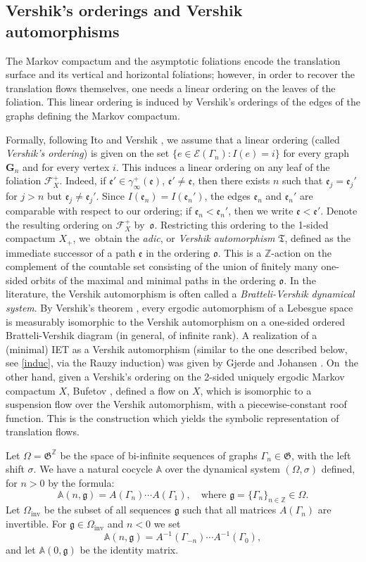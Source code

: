 \documentclass[JEP,XML,SOM,Unicode]{cedram}
\let\mathcal\mathscr
\newcommand{\inv}{\mathrm{inv}}
\theoremstyle{plain}
\theoremstyle{definition}
\newcommand \G {{\boldsymbol G}}
\let\gam\gamma
\let\Om\Omega
\let\Gam\Gamma
\let\sig\sigma
\newcommand\ef{\mathfrak{e}}
\newcommand\gf{\mathfrak{g}}
\newcommand\ok{\mathfrak{o}}
\newcommand\Frg{\mathfrak{G}}
\newcommand{\Ek}{\mathcal{E}}
\newcommand{\Fk}{\mathcal{F}}
\newcommand\Aa{\mathbb{A}}
\newcommand{\Z}{\mathbb{Z}}
\begin{document}
\subsection{Vershik's orderings and Vershik automorphisms}
The Markov compactum and the asymptotic foliations encode the translation surface and its vertical and horizontal foliations; however, in order to recover the translation flows themselves, one needs a linear ordering on the leaves of the foliation. This linear ordering is induced by Vershik's orderings of the edges of the graphs defining the Markov compactum.

Formally, following Ito \cite{Ito} and Vershik \cite{Vershik1,Vershik2}, we assume that a linear ordering (called \emph{Vershik's ordering}) is given on the set $\{e\in \Ek(\Gam_n): I(e)=i\}$ for every graph~$\G_n$ and for every vertex $i$. This induces a linear ordering on any leaf of the foliation $\Fk_X^+$. Indeed, if $\ef' \in \gam_\infty^+(\ef)$, $\ef'\ne \ef$, then there exists $n$ such that $\ef_j = \ef_j'$ for $j>n$ but $\ef_j \ne \ef_j'$. Since $I(\ef_n) = I(\ef_n')$, the edges $\ef_n$ and $\ef_n'$ are comparable with respect to our ordering; if $\ef_n < \ef_n'$, then we write $\ef< \ef'$.
Denote the resulting ordering on $\Fk_X^+$ by~$\ok$.
Restricting this ordering to the 1-sided compactum $X_+$, we~obtain the \emph{adic}, or \emph{Vershik automorphism}
$\mathfrak{T}$, defined as the immediate successor of a path $\ef$ in the ordering $\ok$. This is a $\Z$-action on the complement of the countable set consisting of the union of finitely many one-sided orbits of the maximal and minimal paths in the ordering $\ok$. In the literature, the Vershik automorphism is often called a \emph{Bratteli-Vershik dynamical system}.
By Vershik's theorem \cite{Vershik1,Vershik2}, every ergodic automorphism of a Lebesgue space is measurably isomorphic to the Vershik automorphism on a one-sided ordered Bratteli-Vershik diagram (in general, of infinite rank). A realization of a (minimal) IET as a Vershik automorphism (similar to the one described below, see \eqref{induc}, via the Rauzy induction) was given by Gjerde and Johansen \cite{GJ}. On~the other hand, given a Vershik's ordering on the 2-sided uniquely ergodic Markov compactum $X$, Bufetov \cite{Buf-umn}, defined a flow on $X$, which is isomorphic to a suspension flow over the Vershik automorphism, with a piecewise-constant roof function. This is the construction which yields the symbolic representation of translation flows.

 Let $\Om=\Frg^\Z$ be the space of bi-infinite sequences of graphs $\Gam_n \in \Frg$, with the left shift
$\sig$. We have a natural cocycle $\Aa$ over the dynamical system $(\Om,\sig)$ defined, for $n>0$ by the formula:
\[
\Aa(n,\gf) = A(\Gam_n)\cdots A(\Gam_1),\quad \text{where } \gf = \{\Gam_n\}_{n\in \Z}\in \Om.
\]
Let $\Om_{\inv}$ be the subset of all sequences $\gf$ such that all matrices $A(\Gam_n)$ are invertible. For $\gf\in \Om_{\inv}$ and $n<0$ we set
\[
\Aa(n,\gf) = A^{-1}(\Gam_{-n})\cdots A^{-1}(\Gam_0),
\]
and let $\Aa(0,\gf)$ be the identity matrix.
\end{document}
